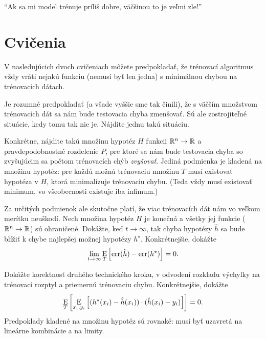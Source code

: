 \begin{remark}
  ``Ak sa mi model trénuje príliš dobre, väčšinou to je veľmi zle!''
\end{remark}



\section{Cvičenia}

V nasledujúcich dvoch cvičeniach môžete predpokladať, že trénovací
algoritmus vždy vráti nejakú funkciu (nemusí byť len jedna)
s minimálnou chybou na trénovacích dátach.

\begin{exercise}
  Je rozumné predpokladať (a všade vyššie sme tak činili), že s väčším
  množstvom trénovacích dát sa nám bude testovacia chyba zmenšovať. Sú
  ale zostrojiteľné situácie, kedy tomu tak nie je. Nájdite jednu takú
  situáciu.
  
  Konkrétne, nájdite takú množinu hypotéz $H$ funkcii $\mathbb{R}^n \to \mathbb{R}$
  a pravdepodobnostné rozdelenie $P$, pre ktoré sa nám bude testovacia
  chyba so zvyšujúcim sa počtom trénovacích chýb \emph{zvyšovať}. Jediná
  podmienka je kladená na množinu hypotéz: pre každú možnú trénovaciu
  množinu $T$ musí existovať hypotéza v $H$, ktorá minimalizuje
  trénovaciu chybu. (Teda vždy musí existovať minimum, vo všeobecnosti
  existuje iba infimum.)
\end{exercise}

\begin{exercise}
  Za určitých podmienok ale skutočne platí, že viac trénovacích dát
  nám vo veľkom merítku neuškodí. Nech množina hypotéz $H$ je konečná
  a všetky jej funkcie ($\mathbb{R}^n \to \mathbb{R}$) sú ohraničené. Dokážte,
  keď $t \to \infty$, tak chyba hypotézy $\hat{h}$ sa bude blížiť k
  chybe najlepšej možnej hypotézy $h^\star$. Konkrétnejšie, dokážte
  $$\lim_{t \to \infty} \operatorname*{\mathrm{E}}_T \left[ \mathrm{err}(\hat{h}) - \mathrm{err}(h^\star) \right] = 0.$$
\end{exercise}

\begin{exercise}
  Dokážte korektnosť druhého technického kroku, v odvodení rozkladu
  výchylky na trénovací rozptyl a priemernú trénovaciu chybu. Konkrétnejšie,
  dokážte
  $$ \operatorname*{\mathrm{E}}_T \left[ \operatorname*{\mathrm{E}}_{x_i, y_i} \left[ (h^\star(x_i) - \hat{h}(x_i)) \cdot (\hat{h}(x_i) - y_i) \right] \right] = 0. $$
  Predpoklady kladené na množinu hypotéz sú rovnaké: musí byť uzavretá
  na lineárne kombinácie a na limity.
\end{exercise}


